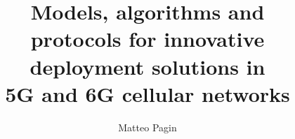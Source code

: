 \usepackage{bookmark}

%

\usepackage[%
  autocite     = plain,
  backend      = biber,
  doi          = true,
  url          = true,
  giveninits   = true,
  hyperref     = true,
  maxbibnames  = 99,
  maxcitenames = 99,
  sorting		   = none,
  style        = numeric-comp,
  ]{biblatex}
\hypersetup{
  colorlinks=true,
  citecolor=UNIPDRED,
  linkcolor=UNIPDRED,
  urlcolor=UNIPDRED
}
  
 \usepackage{xurl}






\onehalfspacing

\renewcommand{\th}{\textsuperscript{\textup{th}}\xspace}



\makeindex
\makeglossaries


\title{\textcolor{UNIPDRED}{Models, algorithms and\\[0.2cm] protocols for innovative\\[0.2cm] deployment solutions in\\[0.2cm] 5G and 6G cellular networks}}
\author{Matteo Pagin}



\frontmatter
  
  
  
  \newpage\phantom{justskipthepage}

